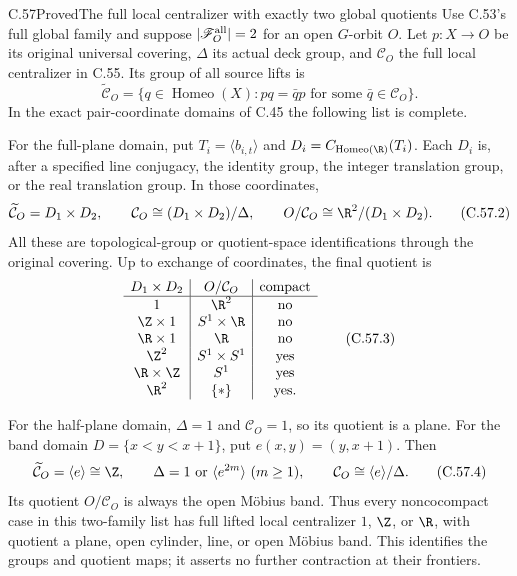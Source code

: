\begin{claim}{C.57}{Proved}{The full local centralizer with exactly two global quotients}
Use C.53's full global family and suppose
$|\mathscr F_O^{\rm all}|=2$ for an open $G$-orbit $O$.
Let $p:X\to O$ be its original universal covering,
$\Delta$ its actual deck group, and
$\mathcal C_O$ the full local centralizer in C.55.
Its group of all source lifts is
\[
 \widetilde{\mathcal C}_O
   =\{q\in\operatorname{Homeo}(X):
                   pq=\bar q p\text{ for some }\bar q\in\mathcal C_O\}.
                                                               \tag{C.57.1}
\]
In the exact pair-coordinate domains of C.45 the
following list is complete.

For the full-plane domain, put
$T_i=\langle b_{i,t}\rangle$ and
$D_i=C_{\operatorname{Homeo}(\R)}(T_i)$.
Each $D_i$ is, after a specified line conjugacy,
the identity group, the integer translation group,
or the real translation group. In those coordinates,
\[
 \widetilde{\mathcal C}_O=D_1\times D_2,\qquad
 \mathcal C_O\cong(D_1\times D_2)/\Delta,\qquad
 O/\mathcal C_O\cong\R^2/(D_1\times D_2).               \tag{C.57.2}
\]
All these are topological-group or quotient-space
identifications through the original covering.
Up to exchange of coordinates, the final quotient is
\[
\begin{array}{c|c|c}
 D_1\times D_2& O/\mathcal C_O &\text{compact}\\ \hline
 1&\R^2&\text{no}\\
 \Z\times1&S^1\times\R&\text{no}\\
 \R\times1&\R&\text{no}\\
 \Z^2&S^1\times S^1&\text{yes}\\
 \R\times\Z&S^1&\text{yes}\\
 \R^2&\{\ast\}&\text{yes}.
\end{array}                                              \tag{C.57.3}
\]

For the half-plane domain, $\Delta=1$ and
$\mathcal C_O=1$, so its quotient is a plane.
For the band domain $D=\{x<y<x+1\}$, put
$e(x,y)=(y,x+1)$. Then
\[
 \widetilde{\mathcal C}_O=\langle e\rangle\cong\Z,\qquad
 \Delta=1\ \text{or}\ \langle e^{2m}\rangle\ (m\geq1),
 \qquad
 \mathcal C_O\cong\langle e\rangle/\Delta.               \tag{C.57.4}
\]
Its quotient $O/\mathcal C_O$ is always the open
M\"obius band. Thus every noncocompact case in this
two-family list has full lifted local centralizer
$1$, $\Z$, or $\R$, with quotient a plane, open
cylinder, line, or open M\"obius band.
This identifies the groups and quotient maps;
it asserts no further contraction at their frontiers.
\end{claim}

